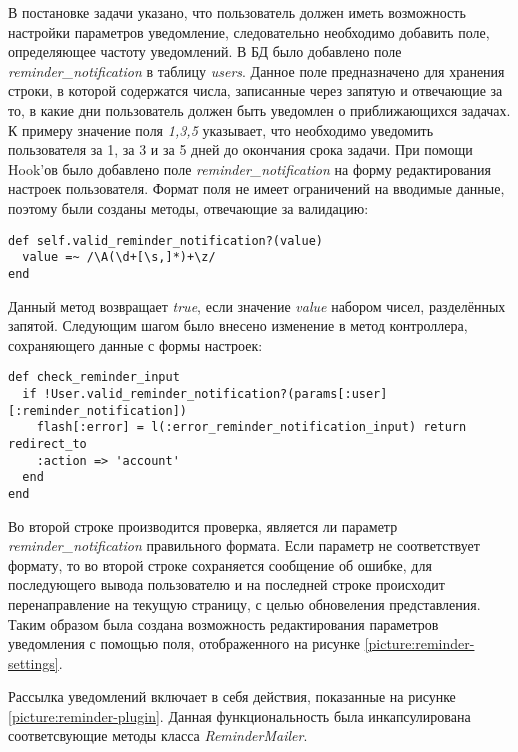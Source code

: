 В постановке задачи указано, что пользователь должен иметь возможность
настройки параметров уведомление, следовательно необходимо добавить поле,
определяющее частоту уведомлений. В БД было добавлено поле
\textit{reminder\_notification} в таблицу \textit{users}. Данное поле
предназначено для хранения строки, в которой содержатся числа, записанные через
запятую и отвечающие за то, в какие дни пользователь должен быть уведомлен о
приближающихся задачах. К примеру значение поля \textit{1,3,5} указывает, что
необходимо уведомить пользователя за 1, за 3 и за 5 дней до окончания срока
задачи. При помощи Hook'ов было добавлено поле \textit{reminder\_notification}
на форму редактирования настроек пользователя.
Формат поля не имеет ограничений на вводимые данные, поэтому были созданы
методы, отвечающие за валидацию:
\small{\begin{lstlisting}
def self.valid_reminder_notification?(value)
  value =~ /\A(\d+[\s,]*)+\z/
end
\end{lstlisting}}
Данный метод возвращает \textit{true}, если значение \textit{value}
набором чисел, разделённых запятой. Следующим шагом было внесено
изменение в метод контроллера, сохраняющего данные с формы настроек:
\small{\begin{lstlisting}
def check_reminder_input
  if !User.valid_reminder_notification?(params[:user][:reminder_notification])
    flash[:error] = l(:error_reminder_notification_input) return redirect_to
    :action => 'account'
  end
end
\end{lstlisting}}
Во второй строке производится проверка, является ли параметр
\textit{reminder\_notification} правильного формата.
Если параметр не соответствует формату, то во второй строке сохраняется
сообщение об ошибке, для последующего вывода пользователю и на последней
строке происходит перенаправление на текущую страницу, с  целью обновеления
представления. Таким образом была создана возможность редактирования
параметров уведомления с помощью поля, отображенного на рисунке
\ref{picture:reminder-settings}.

Рассылка уведомлений включает в себя действия, показанные на рисунке 
\ref{picture:reminder-plugin}. Данная функциональность была инкапсулирована
соответсвующие методы класса \textit{ReminderMailer}.

